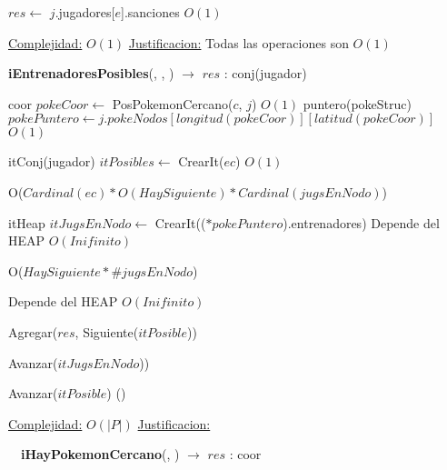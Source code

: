 \begin{Algoritmos}
\begin{algorithm}[H]
\begin{algorithmic}[1]
\State $res \gets$ $j$.jugadores[$e$].sanciones \Comment $O(1)$

\medskip
\State \underline{Complejidad:} $O(1)$
\State \underline{Justificacion:} Todas las operaciones son $O(1)$


\end{algorithmic}
\end{algorithm}


\begin{algorithm}[H]
{\textbf{iEntrenadoresPosibles}(, , ) $\to$ $res$ : conj(jugador)}
\begin{algorithmic}[1]

\State coor $pokeCoor \gets$ PosPokemonCercano($c$, $j$) \Comment $O(1)$
\State puntero(pokeStruc) $pokePuntero \gets j.pokeNodos[longitud(pokeCoor)][latitud(pokeCoor)]$ \Comment $O(1)$

\State itConj(jugador) $itPosibles \gets$ CrearIt($ec$) \Comment $O(1)$

   \Comment O($Cardinal(ec) * O(HaySiguiente) * Cardinal(jugsEnNodo)$)
    
    \State itHeap $itJugsEnNodo \gets$ CrearIt(($*pokePuntero$).entrenadores)     \Comment Depende del HEAP $O(Inifinito)$
    
       \Comment O($HaySiguiente * \#jugsEnNodo$)

           \Comment Depende del HEAP $O(Inifinito)$
        
            \State Agregar($res$, Siguiente($itPosible$))
    
        \EndIf
        
        \State Avanzar($itJugsEnNodo$))
    
    \EndWhile
    
    \State Avanzar($itPosible$)   \Comment()



\EndWhile


\medskip
\State \underline{Complejidad:} $O(|P|)$
\State \underline{Justificacion:} 

\end{algorithmic}
\end{algorithm}


$ $\newline
$ $\newline
$ $\newline
{\textbf{iHayPokemonCercano}(, ) $\to$ $res$ : coor}
\begin{algorithmic}[1]


\end{algorithmic}
\end{Algoritmos}
